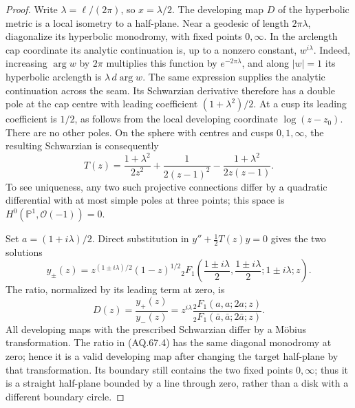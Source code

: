 \begin{proof}
Write $\lambda=\ell/(2\pi)$, so $x=\lambda/2$.
The developing map $D$ of the hyperbolic metric is a local isometry
to a half-plane. Near a geodesic of length $2\pi\lambda$, diagonalize
its hyperbolic monodromy, with fixed points $0,\infty$.
In the arclength cap coordinate its analytic continuation is, up
to a nonzero constant, $w^{i\lambda}$. Indeed, increasing
$\arg w$ by $2\pi$ multiplies this function by $e^{-2\pi\lambda}$,
and along $|w|=1$ its hyperbolic arclength is
$\lambda\,d\arg w$. The same expression supplies the analytic
continuation across the seam. Its Schwarzian derivative therefore
has a double pole at the cap centre with leading coefficient
$(1+\lambda^2)/2$. At a cusp its leading coefficient is $1/2$,
as follows from the local developing coordinate $\log(z-z_0)$.
There are no other poles. On the sphere with centres and cusps
$0,1,\infty$, the resulting Schwarzian is consequently
\[
 T(z)=\frac{1+\lambda^2}{2z^2}
       +\frac1{2(z-1)^2}
       -\frac{1+\lambda^2}{2z(z-1)}.                           \tag{AQ.67.3}
\]
To see uniqueness, any two such projective connections differ by
a quadratic differential with at most simple poles at three points;
this space is $H^0(\mathbb P^1,\mathcal O(-1))=0$.

Set $a=(1+i\lambda)/2$. Direct substitution in
$y''+\tfrac12T(z)y=0$ gives the two solutions
\[
 y_\pm(z)=z^{(1\pm i\lambda)/2}(1-z)^{1/2}
     {}_2F_1\!\left(\frac{1\pm i\lambda}{2},
                    \frac{1\pm i\lambda}{2};
                    1\pm i\lambda;z\right).
\]
The ratio, normalized by its leading term at zero, is
\[
 D(z)=\frac{y_+(z)}{y_-(z)}
     =z^{i\lambda}
       \frac{{}_2F_1(a,a;2a;z)}
            {{}_2F_1(\bar a,\bar a;2\bar a;z)}.                \tag{AQ.67.4}
\]
All developing maps with the prescribed Schwarzian differ by a
M\"obius transformation. The ratio in (AQ.67.4) has the same
diagonal monodromy at zero; hence it is a valid developing map
after changing the target half-plane by that transformation.
Its boundary still contains the two fixed points $0,\infty$;
thus it is a straight half-plane bounded by a line through zero,
rather than a disk with a different boundary circle.


\end{proof}
